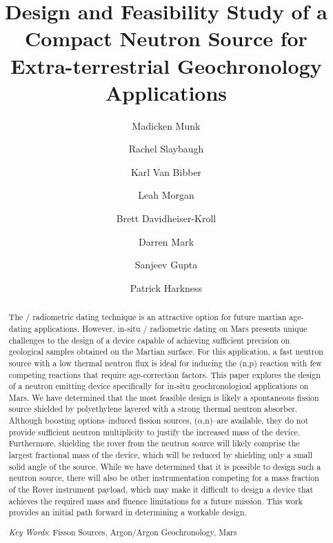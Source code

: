 \documentclass{mc2015}
\begin{document}
\title{Design and Feasibility Study of a Compact Neutron Source for Extra-terrestrial Geochronology Applications}

\author{Madicken Munk}
\author{Rachel Slaybaugh}
\author{Karl Van Bibber}

\author{Leah Morgan}
\author{Brett Davidheiser-Kroll}
\author{Darren Mark}
\author{Sanjeev Gupta}
\author{Patrick Harkness}

\maketitle

\begin{abstract}
The / radiometric dating technique is an attractive option for future martian age-dating applications. However, in-situ / radiometric dating on Mars presents unique challenges to the design of a device capable of achieving sufficient precision on geological samples obtained on the Martian surface. For this application, a fast neutron source with a low thermal neutron flux is ideal for inducing the (n,p) reaction with few competing reactions that require age-correction factors. This paper explores the design of a neutron emitting device specifically for in-situ geochronological applications on Mars. We have determined that the most feasible design is likely a  spontaneous fission source shielded by polyethylene layered with a strong thermal neutron absorber. Although boosting options--induced fission sources, ($\alpha$,n)--are available, they do not provide sufficient neutron multiplicity to justify the increased mass of the device. Furthermore, shielding the rover from the neutron source will likely comprise the largest fractional mass of the device, which will be reduced by shielding only a small solid angle of the source. While we have determined that it is possible to design such a neutron source, there will also be other instrumentation competing for a mass fraction of the Rover instrument payload, which may make it difficult to design a device that achieves the required mass and fluence limitations for a future mission. This work provides an initial path forward in determining a workable design.  

\emph{Key Words}: Fisson Sources, Argon/Argon Geochronology, Mars
\end{abstract}
\end{document}
